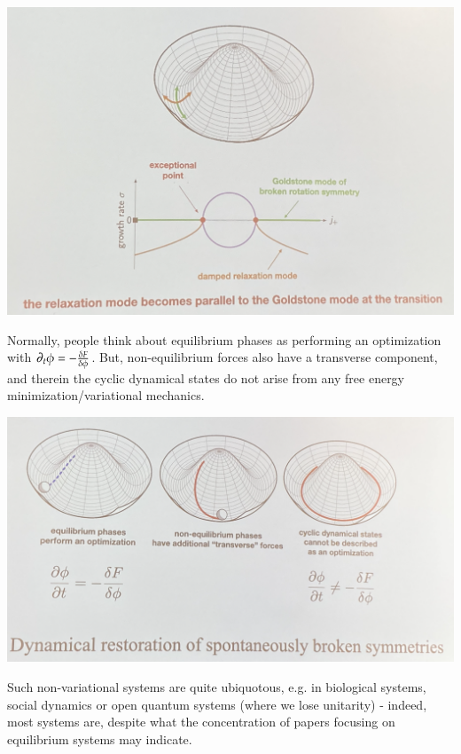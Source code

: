 \begin{center}
    \includegraphics[scale=0.3]{Lectures/Images/lec18-goldstone.png}
\end{center}

Normally, people think about equilibrium phases as performing an optimization with $\partial_t \phi = -\frac{\delta F}{\delta \phi}$. But, non-equilibrium forces also have a transverse component, and therein the cyclic dynamical states do not arise from any free energy minimization/variational mechanics. 

\begin{center}
    \includegraphics[scale=0.3]{Lectures/Images/lec18-nonvariational.png}
\end{center}

Such non-variational systems are quite ubiquotous, e.g. in biological systems, social dynamics or open quantum systems (where we lose unitarity) - indeed, most systems are, despite what the concentration of papers focusing on equilibrium systems may indicate.